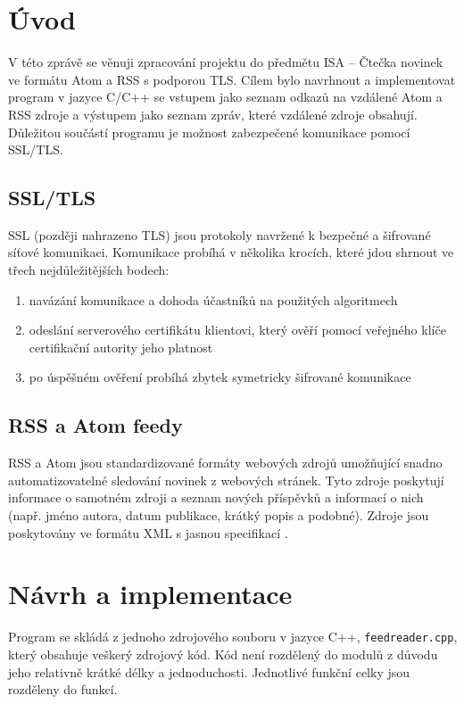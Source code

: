 \chapter{Úvod}
V této zprávě se věnuji zpracování projektu do předmětu ISA -- Čtečka novinek ve formátu Atom a RSS s podporou TLS. Cílem bylo navrhnout a implementovat program v jazyce C/C++ se vstupem jako seznam odkazů na vzdálené Atom a RSS zdroje a výstupem jako seznam zpráv, které vzdálené zdroje obsahují. Důležitou součástí programu je možnost zabezpečené komunikace pomocí SSL/TLS.

\section{SSL/TLS}
SSL (později nahrazeno TLS) jsou protokoly navržené k bezpečné a šifrované síťové komunikaci. Komunikace probíhá v několika krocích, které jdou shrnout ve třech nejdůležitějších bodech: \cite{SSL}
\begin{enumerate}
    \item navázání komunikace a dohoda účastníků na použitých algoritmech
    \item odeslání serverového certifikátu klientovi, který ověří pomocí veřejného klíče certifikační autority jeho platnost
    \item po úspěšném ověření probíhá zbytek symetricky šifrované komunikace
\end{enumerate}

\section{RSS a Atom feedy}
RSS a Atom jsou standardizované formáty webových zdrojů umožňující snadno automatizovatelné sledování novinek z webových stránek. Tyto zdroje poskytují informace o samotném zdroji a seznam nových příspěvků a informací o nich (např. jméno autora, datum publikace, krátký popis a podobné). Zdroje jsou poskytovány ve formátu XML s jasnou specifikací \cite{RSS} \cite{Atom}.

\chapter{Návrh a implementace}
Program se skládá z jednoho zdrojového souboru v jazyce C++, \texttt{feedreader.cpp}, který obsahuje veškerý zdrojový kód. Kód není rozdělený do modulů z důvodu jeho relativně krátké délky a jednoduchosti. Jednotlivé funkční celky jsou rozděleny do funkcí.


